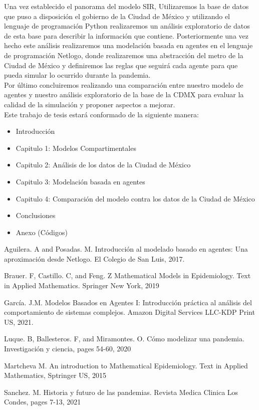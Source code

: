 \documentclass[a4paper,openany,12pt]{article}
\begin{document}
Una vez establecido el panorama del modelo SIR, Utilizaremos la base de datos que puso a disposición el gobierno de la Ciudad de México y utilizando el lenguaje de programación Python realizaremos un análisis exploratorio de datos de esta base para describir la información que contiene. Posteriormente una vez hecho este análisis realizaremos una modelación basada en agentes en el lenguaje de programación Netlogo, donde realizaremos una abstracción del metro de la Ciudad de México y definiremos las reglas que seguirá cada agente para que pueda simular lo ocurrido durante la pandemia.\\

Por último concluiremos realizando una comparación entre nuestro modelo de agentes y nuestro análisis exploratorio de la base de la CDMX para evaluar la calidad de la simulación y proponer aspectos a mejorar.\\

Este trabajo de tesis estará conformado de la siguiente manera:
\begin{itemize}
\item Introducción
\item Capitulo 1: Modelos Compartimentales
\item Capitulo 2: Análisis de los datos de la Ciudad de México
\item Capitulo 3: Modelación basada en agentes
\item Capitulo 4: Comparación del modelo contra los datos de la Ciudad de México
\item Conclusiones
\item Anexo (Códigos)
\end{itemize}

\begin{thebibliography}{5}

Aguilera. A and Posadas. M. Introducción al modelado basado en agentes: Una aproximación desde Netlogo. El Colegio de San Luis, 2017.

Brauer. F, Castillo. C, and Feng. Z Mathematical Models in Epidemiology. Text in Applied Mathematics. Springer New York, 2019

García. J.M. Modelos Basados en Agentes I: Introducción práctica al análisis del comportamiento de sistemas complejos. Amazon Digital Services LLC-KDP Print US, 2021.

Luque. B, Ballesteros. F, and Miramontes. O. Cómo modelizar una pandemia. Investigación y ciencia, pages 54-60, 2020

Martcheva M. An introduction to Mathematical Epidemiology. Text in Applied Mathematics, Sptringer US, 2015 

Sanchez. M. Historia y futuro de las pandemias. Revista Medica Clinica Los Condes, pages 7-13, 2021

\end{thebibliography}
\end{document}
